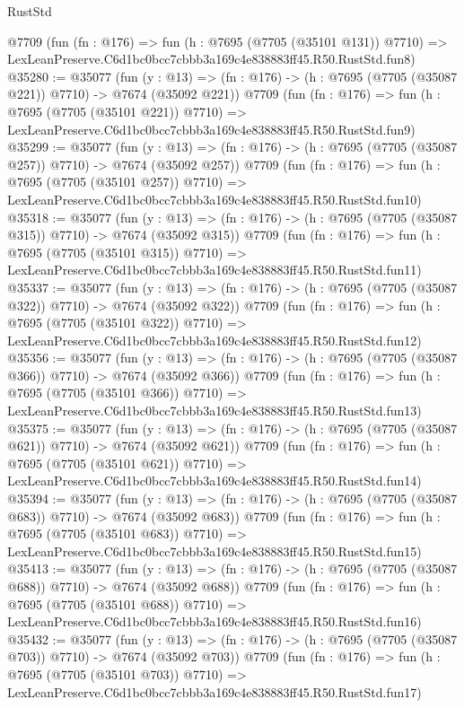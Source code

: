 \begin{lexlean}{RustStd}
\begin{coremodule}
    @7709
    (fun (fn : @176) =>
    fun (h : @7695 (@7705 (@35101 @131)) @7710) =>
    LexLeanPreserve.C6d1bc0bcc7cbbb3a169c4e838883ff45.R50.RustStd.fun8)
@35280 := @35077
    (fun (y : @13) => (fn : @176) -> (h : @7695 (@7705 (@35087 @221)) @7710) -> @7674 (@35092 @221))
    @7709
    (fun (fn : @176) =>
    fun (h : @7695 (@7705 (@35101 @221)) @7710) =>
    LexLeanPreserve.C6d1bc0bcc7cbbb3a169c4e838883ff45.R50.RustStd.fun9)
@35299 := @35077
    (fun (y : @13) => (fn : @176) -> (h : @7695 (@7705 (@35087 @257)) @7710) -> @7674 (@35092 @257))
    @7709
    (fun (fn : @176) =>
    fun (h : @7695 (@7705 (@35101 @257)) @7710) =>
    LexLeanPreserve.C6d1bc0bcc7cbbb3a169c4e838883ff45.R50.RustStd.fun10)
@35318 := @35077
    (fun (y : @13) => (fn : @176) -> (h : @7695 (@7705 (@35087 @315)) @7710) -> @7674 (@35092 @315))
    @7709
    (fun (fn : @176) =>
    fun (h : @7695 (@7705 (@35101 @315)) @7710) =>
    LexLeanPreserve.C6d1bc0bcc7cbbb3a169c4e838883ff45.R50.RustStd.fun11)
@35337 := @35077
    (fun (y : @13) => (fn : @176) -> (h : @7695 (@7705 (@35087 @322)) @7710) -> @7674 (@35092 @322))
    @7709
    (fun (fn : @176) =>
    fun (h : @7695 (@7705 (@35101 @322)) @7710) =>
    LexLeanPreserve.C6d1bc0bcc7cbbb3a169c4e838883ff45.R50.RustStd.fun12)
@35356 := @35077
    (fun (y : @13) => (fn : @176) -> (h : @7695 (@7705 (@35087 @366)) @7710) -> @7674 (@35092 @366))
    @7709
    (fun (fn : @176) =>
    fun (h : @7695 (@7705 (@35101 @366)) @7710) =>
    LexLeanPreserve.C6d1bc0bcc7cbbb3a169c4e838883ff45.R50.RustStd.fun13)
@35375 := @35077
    (fun (y : @13) => (fn : @176) -> (h : @7695 (@7705 (@35087 @621)) @7710) -> @7674 (@35092 @621))
    @7709
    (fun (fn : @176) =>
    fun (h : @7695 (@7705 (@35101 @621)) @7710) =>
    LexLeanPreserve.C6d1bc0bcc7cbbb3a169c4e838883ff45.R50.RustStd.fun14)
@35394 := @35077
    (fun (y : @13) => (fn : @176) -> (h : @7695 (@7705 (@35087 @683)) @7710) -> @7674 (@35092 @683))
    @7709
    (fun (fn : @176) =>
    fun (h : @7695 (@7705 (@35101 @683)) @7710) =>
    LexLeanPreserve.C6d1bc0bcc7cbbb3a169c4e838883ff45.R50.RustStd.fun15)
@35413 := @35077
    (fun (y : @13) => (fn : @176) -> (h : @7695 (@7705 (@35087 @688)) @7710) -> @7674 (@35092 @688))
    @7709
    (fun (fn : @176) =>
    fun (h : @7695 (@7705 (@35101 @688)) @7710) =>
    LexLeanPreserve.C6d1bc0bcc7cbbb3a169c4e838883ff45.R50.RustStd.fun16)
@35432 := @35077
    (fun (y : @13) => (fn : @176) -> (h : @7695 (@7705 (@35087 @703)) @7710) -> @7674 (@35092 @703))
    @7709
    (fun (fn : @176) =>
    fun (h : @7695 (@7705 (@35101 @703)) @7710) =>
    LexLeanPreserve.C6d1bc0bcc7cbbb3a169c4e838883ff45.R50.RustStd.fun17)

\end{coremodule}
\end{lexlean}
